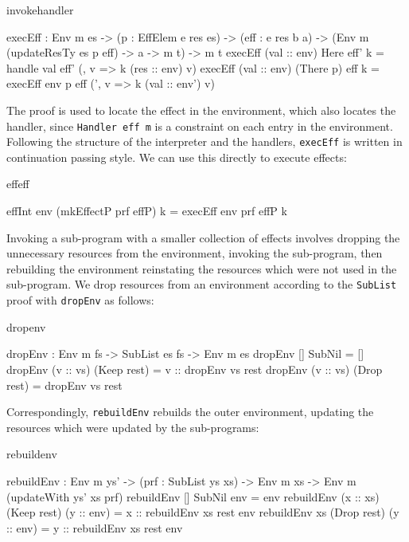 \noindent
\begin{SaveVerbatim}{invokehandler}

 execEff : Env m es -> (p : EffElem e res es) -> 
           (eff : e res b a) ->
           (Env m (updateResTy es p eff) -> a -> m t) -> 
           m t
 execEff (val :: env) Here eff' k 
     = handle val eff' (\res, v => k (res :: env) v)
 execEff (val :: env) (There p) eff k 
     = execEff env p eff (\env', v => k (val :: env') v)

\end{SaveVerbatim}

\noindent
The proof is used to locate the effect in the environment, which also locates
the handler, since \texttt{Handler eff m} is a constraint on each entry in
the environment. Following the structure of the interpreter and the handlers,
\texttt{execEff} is written in continuation passing style. We can use this
directly to execute effects:

\begin{SaveVerbatim}{effeff}

effInt env (mkEffectP prf effP) k 
                   = execEff env prf effP k

\end{SaveVerbatim}

\noindent
Invoking a sub-program with a smaller collection of effects involves dropping
the unnecessary resources from the environment, invoking the sub-program, then
rebuilding the environment reinstating the resources which were not used in the
sub-program. We drop resources from an environment according to the 
\texttt{SubList} proof with \texttt{dropEnv} as follows:

\begin{SaveVerbatim}{dropenv}

dropEnv : Env m fs -> SubList es fs -> Env m es
dropEnv [] SubNil = []
dropEnv (v :: vs) (Keep rest) = v :: dropEnv vs rest
dropEnv (v :: vs) (Drop rest) = dropEnv vs rest

\end{SaveVerbatim}

\noindent
Correspondingly, \texttt{rebuildEnv} rebuilds the outer environment, updating
the resources which were updated by the sub-programs:

\begin{SaveVerbatim}{rebuildenv}

rebuildEnv : Env m ys' -> (prf : SubList ys xs) -> 
             Env m xs -> Env m (updateWith ys' xs prf) 
rebuildEnv []        SubNil      env = env
rebuildEnv (x :: xs) (Keep rest) (y :: env) 
      = x :: rebuildEnv xs rest env
rebuildEnv xs        (Drop rest) (y :: env) 
      = y :: rebuildEnv xs rest env

\end{SaveVerbatim}

